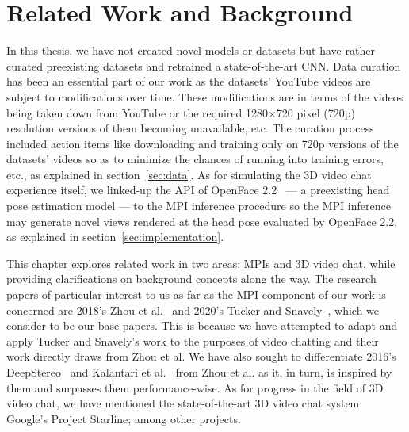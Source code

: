 \chapter{Related Work and Background}\label{ch2:related-work-background}

In this thesis, we have not created novel models or datasets but have rather curated preexisting datasets and retrained a state-of-the-art CNN. Data curation has been an essential part of our work as the datasets' YouTube videos are subject to modifications over time. These modifications are in terms of the videos being taken down from YouTube or the required 1280$\times$720 pixel (720p) resolution versions of them becoming unavailable, etc. The curation process included action items like downloading and training only on 720p versions of the datasets' videos so as to minimize the chances of running into training errors, etc., as explained in section~\ref{sec:data}. As for simulating the 3D video chat experience itself, we linked-up the API of OpenFace 2.2~\cite{baltrusaitis_openface_2018} --- a preexisting head pose estimation model --- to the MPI inference procedure so the MPI inference may generate novel views rendered at the head pose evaluated by OpenFace 2.2, as explained in section~\ref{sec:implementation}.

This chapter explores related work in two areas: MPIs and 3D video chat, while providing clarifications on background concepts along the way. The research papers of particular interest to us as far as the MPI component of our work is concerned are 2018's Zhou et al.~\cite{zhou2018stereo} and 2020's Tucker and Snavely~\cite{single_view_mpi}, which we consider to be our base papers. This is because we have attempted to adapt and apply Tucker and Snavely's work to the purposes of video chatting and their work directly draws from Zhou et al. We have also sought to differentiate 2016's DeepStereo~\cite{deep_stereo_2016} and Kalantari et al.~\cite{kalantari_2016} from Zhou et al. as it, in turn, is inspired by them and surpasses them performance-wise. As for progress in the field of 3D video chat, we have mentioned the state-of-the-art 3D video chat system: Google's Project Starline; among other projects.


% 
